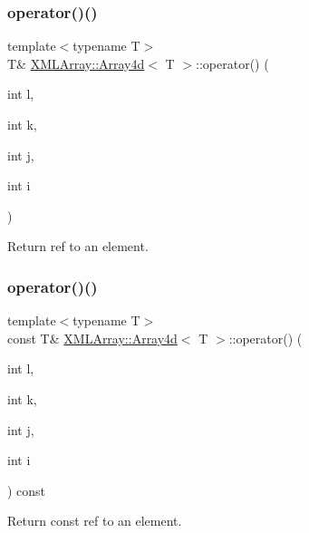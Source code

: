 \subsubsection{\texorpdfstring{operator()()}{operator()()}\hspace{0.1cm}{\footnotesize\ttfamily [2/4]}}
{\footnotesize\ttfamily template$<$typename T$>$ \\
T\& \mbox{\hyperlink{classXMLArray_1_1Array4d}{X\+M\+L\+Array\+::\+Array4d}}$<$ T $>$\+::operator() (\begin{DoxyParamCaption}\item[{int}]{l,  }\item[{int}]{k,  }\item[{int}]{j,  }\item[{int}]{i }\end{DoxyParamCaption})\hspace{0.3cm}{\ttfamily [inline]}}



Return ref to an element. 

\mbox{\label{classXMLArray_1_1Array4d_ae9076800aed9ec98d434d01fcaf4ba3a}} 
\subsubsection{\texorpdfstring{operator()()}{operator()()}\hspace{0.1cm}{\footnotesize\ttfamily [3/4]}}
{\footnotesize\ttfamily template$<$typename T$>$ \\
const T\& \mbox{\hyperlink{classXMLArray_1_1Array4d}{X\+M\+L\+Array\+::\+Array4d}}$<$ T $>$\+::operator() (\begin{DoxyParamCaption}\item[{int}]{l,  }\item[{int}]{k,  }\item[{int}]{j,  }\item[{int}]{i }\end{DoxyParamCaption}) const\hspace{0.3cm}{\ttfamily [inline]}}



Return const ref to an element. 

\mbox{\label{classXMLArray_1_1Array4d_ae9076800aed9ec98d434d01fcaf4ba3a}} 
